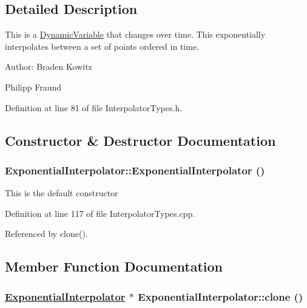 \subsection{Detailed Description}
This is a \hyperlink{classDynamicVariable}{Dynamic\-Variable} that changes over time. This exponentially interpolates between a set of points ordered in time. \begin{Desc}
\item[Author:]Braden Kowitz 

Philipp Fraund \end{Desc}




Definition at line 81 of file Interpolator\-Types.h.

\subsection{Constructor \& Destructor Documentation}
\hypertarget{classExponentialInterpolator_a0}{
\subsubsection[ExponentialInterpolator]{\setlength{\rightskip}{0pt plus 5cm}Exponential\-Interpolator::Exponential\-Interpolator ()}}
\label{classExponentialInterpolator_a0}


This is the default constructor 

Definition at line 117 of file Interpolator\-Types.cpp.

Referenced by clone().

\subsection{Member Function Documentation}
\hypertarget{classExponentialInterpolator_a1}{
\subsubsection[clone]{\setlength{\rightskip}{0pt plus 5cm}\hyperlink{classExponentialInterpolator}{Exponential\-Interpolator} $\ast$ Exponential\-Interpolator::clone ()}}
\label{classExponentialInterpolator_a1}


